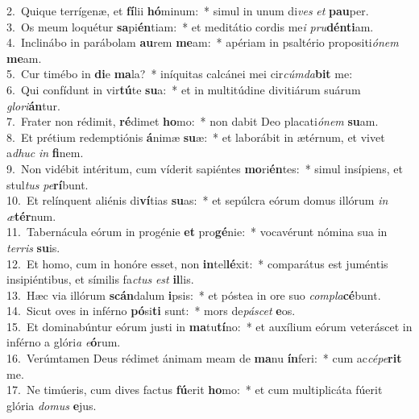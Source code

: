 {2.~}Quique terrígenæ, et \textbf{fí}lii \textbf{hó}minum:~* simul in unum di\textit{ves} \textit{et} \textbf{pau}per.\\
{3.~}Os meum loquétur \textbf{sa}pi\textbf{én}tiam:~* et meditátio cordis me\textit{i} \textit{pru}\textbf{dén}\textbf{ti}am.\\
{4.~}Inclinábo in parábolam \textbf{au}rem \textbf{me}am:~* apériam in psaltério propositi\textit{ó}\textit{nem} \textbf{me}am.\\
{5.~}Cur timébo in \textbf{di}e \textbf{ma}la?~* iníquitas calcánei mei cir\textit{cúm}\textit{da}\textbf{bit} me:\\
{6.~}Qui confídunt in vir\textbf{tú}te \textbf{su}a:~* et in multitúdine divitiárum suárum \textit{glo}\textit{ri}\textbf{án}tur.\\
{7.~}Frater non rédimit, \textbf{ré}dimet \textbf{ho}mo:~* non dabit Deo placati\textit{ó}\textit{nem} \textbf{su}am.\\
{8.~}Et prétium redemptiónis \textbf{á}nimæ \textbf{su}æ:~* et laborábit in ætérnum, et vivet a\textit{dhuc} \textit{in} \textbf{fi}nem.\\
{9.~}Non vidébit intéritum, cum víderit sapiéntes \textbf{mo}ri\textbf{én}tes:~* simul insípiens, et stul\textit{tus} \textit{pe}\textbf{rí}bunt.\\
{10.~}Et relínquent aliénis di\textbf{ví}tias \textbf{su}as:~* et sepúlcra eórum domus illórum \textit{in} \textit{æ}\textbf{tér}num.\\
{11.~}Tabernácula eórum in progénie \textbf{et} pro\textbf{gé}nie:~* vocavérunt nómina sua in \textit{ter}\textit{ris} \textbf{su}is.\\
{12.~}Et homo, cum in honóre esset, non \textbf{in}tel\textbf{lé}xit:~* comparátus est juméntis insipiéntibus, et símilis fa\textit{ctus} \textit{est} \textbf{il}lis.\\
{13.~}Hæc via illórum \textbf{scán}dalum \textbf{i}psis:~* et póstea in ore suo \textit{com}\textit{pla}\textbf{cé}bunt.\\
{14.~}Sicut oves in inférno \textbf{pó}si\textbf{ti} sunt:~* mors de\textit{pá}\textit{scet} \textbf{e}os.\\
{15.~}Et dominabúntur eórum justi in \textbf{ma}tu\textbf{tí}no:~* et auxílium eórum veteráscet in inférno a glóri\textit{a} \textit{e}\textbf{ó}rum.\\
{16.~}Verúmtamen Deus rédimet ánimam meam de \textbf{ma}nu \textbf{ín}feri:~* cum ac\textit{cé}\textit{pe}\textbf{rit} me.\\
{17.~}Ne timúeris, cum dives factus \textbf{fú}erit \textbf{ho}mo:~* et cum multiplicáta fúerit glória \textit{do}\textit{mus} \textbf{e}jus.\\
